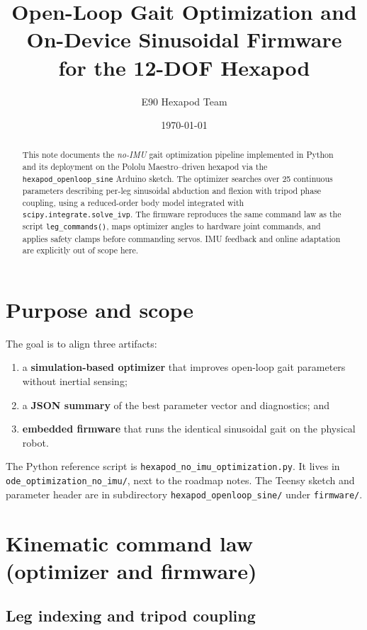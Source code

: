 \documentclass[11pt]{article}
\title{Open-Loop Gait Optimization and\\On-Device Sinusoidal Firmware\\for the 12-DOF Hexapod}
\author{E90 Hexapod Team}
\date{\today}
\begin{document}
\maketitle

\begin{abstract}
This note documents the \emph{no-IMU} gait optimization pipeline implemented in Python and its deployment on the Pololu Maestro--driven hexapod via the \texttt{hexapod\_openloop\_sine} Arduino sketch. The optimizer searches over 25 continuous parameters describing per-leg sinusoidal abduction and flexion with tripod phase coupling, using a reduced-order body model integrated with \texttt{scipy.integrate.solve\_ivp}. The firmware reproduces the same command law as the script \texttt{leg\_commands()}, maps optimizer angles to hardware joint commands, and applies safety clamps before commanding servos. IMU feedback and online adaptation are explicitly out of scope here.
\end{abstract}

\section{Purpose and scope}

The goal is to align three artifacts:
\begin{enumerate}
    \item a \textbf{simulation-based optimizer} that improves open-loop gait parameters without inertial sensing;
    \item a \textbf{JSON summary} of the best parameter vector and diagnostics; and
    \item \textbf{embedded firmware} that runs the identical sinusoidal gait on the physical robot.
\end{enumerate}

\begin{sloppypar}
The Python reference script is \texttt{hexapod\_no\_imu\_optimization.py}. It lives in \texttt{ode\_optimization\_no\_imu/}, next to the roadmap notes. The Teensy sketch and parameter header are in subdirectory \texttt{hexapod\_openloop\_sine/} under \texttt{firmware/}.
\end{sloppypar}

\section{Kinematic command law (optimizer and firmware)}

\subsection{Leg indexing and tripod coupling}
\end{document}
